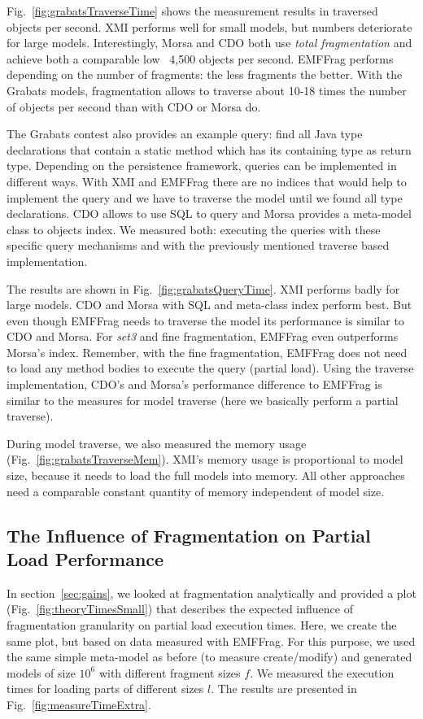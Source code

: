  Fig.~\ref{fig:grabatsTraverseTime} shows the measurement results in traversed objects per second. XMI performs well for small models, but numbers deteriorate for large models. Interestingly, Morsa and CDO both use \emph{total fragmentation} and achieve both a comparable low ~4,500 objects per second. EMFFrag performs depending on the number of fragments: the less fragments the better. With the Grabats models, fragmentation allows to traverse about 10-18 times the number of objects per second than with CDO or Morsa do.

 The Grabats contest also provides an example query: find all Java type declarations that contain a static method which has its containing type as return type. Depending on the persistence framework, queries can be implemented in different ways. With XMI and EMFFrag there are no indices that would help to implement the query and we have to traverse the model until we found all type declarations. CDO allows to use SQL to query and Morsa provides a meta-model class to objects index. We measured both: executing the queries with these specific query mechanisms and with the previously mentioned traverse based implementation.

The results are shown in Fig.~\ref{fig:grabatsQueryTime}. XMI performs badly for large models. CDO and Morsa with SQL and meta-class index perform best. But even though EMFFrag needs to traverse the model its performance is similar to CDO and Morsa. For \emph{set3} and fine fragmentation, EMFFrag even outperforms Morsa's index. Remember, with the fine fragmentation, EMFFrag does not need to load any method bodies to execute the query (partial load). Using the traverse implementation, CDO's and Morsa's performance difference to EMFFrag is similar to the measures for model traverse (here we basically perform a partial traverse).  

 During model traverse, we also measured the memory usage (Fig.~\ref{fig:grabatsTraverseMem}). XMI's memory usage is proportional to model size, because it needs to load the full models into memory. All other approaches need a comparable constant quantity of memory independent of model size.

\subsection{The Influence of Fragmentation on Partial Load Performance}

In section~\ref{sec:gains}, we looked at fragmentation analytically and provided a plot (Fig.~\ref{fig:theoryTimesSmall}) that describes the expected influence of fragmentation granularity on partial load execution times. Here, we create the same plot, but based on data measured with EMFFrag. For this purpose, we used the same simple meta-model as before (to measure create/modify) and generated models of size $10^6$ with different fragment sizes $f$. We measured the execution times for loading parts of different sizes $l$. The results are presented in Fig.~\ref{fig:measureTimeExtra}.

